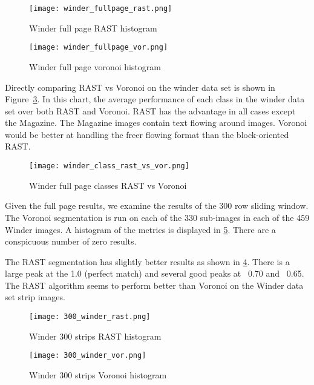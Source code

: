 \documentclass[conference]{IEEEtran}
\begin{document}
\begin{figure}[winder-fullpage-rast]
\texttt{[image: winder\_fullpage\_rast.png]}
\caption{Winder full page RAST histogram}
\label{fig:winder-fullpage-rast}
\end{figure}

\begin{figure}[winder-fullpage-vor]
\texttt{[image: winder\_fullpage\_vor.png]}
\caption{Winder full page voronoi histogram}
\label{fig:winder-fullpage-vor}
\end{figure}

Directly comparing RAST vs Voronoi on the winder data set is shown in
Figure~\ref{fig:winder-class-rast-vs-vor}. In this chart, the average
performance of each class in the winder data set over both RAST and Voronoi.
RAST has the advantage in all cases except the Magazine. The Magazine images
contain text flowing around images. Voronoi would be better at handling the
freer flowing format than the block-oriented RAST.

\begin{figure}[winder-class-rast-vs-vor]
\texttt{[image: winder\_class\_rast\_vs\_vor.png]}
\caption{Winder full page classes RAST vs Voronoi}
\label{fig:winder-class-rast-vs-vor}
\end{figure}

Given the full page results, we examine the results of the 300 row sliding
window. The Voronoi segmentation is run on each of the 330 sub-images in each of
the 459 Winder images. A histogram of the metrics is displayed in
\ref{fig:300-winder-vor}. There are a conspicuous number of zero results. 

The RAST segmentation has slightly better results as shown in
\ref{fig:300-winder-rast}. There is a large peak at the 1.0 (perfect match) and
several good peaks at ~0.70 and ~0.65. The RAST algorithm seems to perform
better than Voronoi on the Winder data set strip images. 

\begin{figure}[300-winder-rast]
\texttt{[image: 300\_winder\_rast.png]}
\caption{Winder 300 strips RAST histogram}
\label{fig:300-winder-rast}
\end{figure}
\begin{figure}[300-winder-vor]
\texttt{[image: 300\_winder\_vor.png]}
\caption{Winder 300 strips Voronoi histogram}
\label{fig:300-winder-vor}
\end{figure}
\end{document}
